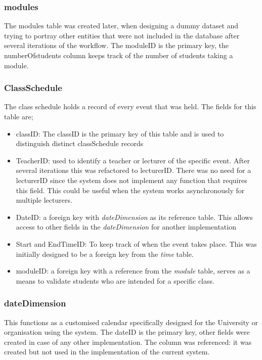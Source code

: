 \subsubsection*{modules}
The modules table was created later, when designing a dummy dataset and trying to portray other entities that were not included in the database after several iterations of the workflow. The moduleID is the primary key, the numberOfstudents column keeps track of the number of students taking a module.
 
\subsubsection*{ClassSchedule}
The class schedule holds a record of every event that was held. The fields for this table are;
\begin{itemize}
 \item classID: The classID is the primary key of this table and is used to distinguish distinct classSchedule records
 \item TeacherID: used to identify a teacher or lecturer of the specific event. After several iterations this was refactored to lecturerID. There was no need for a lecturerID since the system does not implement any function that requires this field. This could be useful when the system works asynchronously for multiple lecturers.
 \item DateID: a foreign key with \textit{dateDimension} as its reference table. This allows access to other fields in the \textit{dateDimension} for another implementation
 \item Start and EndTimeID: To keep track of when the event takes place. This was initially designed to be a foreign key from the \textit{time} table.
 \item moduleID: a foreign key with a reference from the \textit{module} table, serves as a means to validate students who are intended for a specific class.
 \end{itemize}
 
\subsubsection*{dateDimension}
This functions as a customised calendar specifically designed for the University or organisation using the system. The dateID is the primary key, other fields were created in case of any other implementation. The column was referenced: it was created but not used in the implementation of the current system.
 
